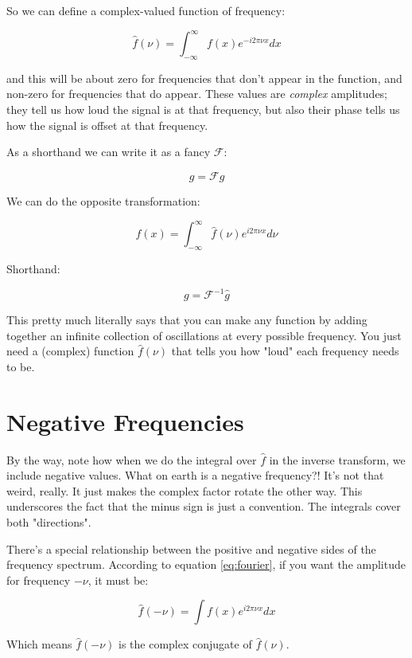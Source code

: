 So we can define a complex-valued function of frequency:

\begin{equation}
    \hat{f}(\nu) = \int_{-\infty}^{\infty} f(x)e^{-i2\pi\nu x} dx
    \label{eq:fourier}
\end{equation}

and this will be about zero for frequencies that don't appear in the function, and non-zero for frequencies that do appear. These values are \textit{complex} amplitudes; they tell us how loud the signal is at that frequency, but also their phase tells us how the signal is offset at that frequency.

As a shorthand we can write it as a fancy $\mathcal{F}$:

$$\hat{g} = \mathcal{F} g$$

We can do the opposite transformation:

\begin{equation}    
f(x) = \int_{-\infty}^{\infty} \hat{f}(\nu)e^{i2\pi\nu x} d\nu
\label{eq:invfourier}
\end{equation}

Shorthand:

$$g = \mathcal{F}^{-1} \hat{g}$$

This pretty much literally says that you can make any function by adding together an infinite collection of oscillations at every possible frequency. You just need a (complex) function $\hat{f}(\nu)$ that tells you how "loud" each frequency needs to be.

\section{Negative Frequencies}

By the way, note how when we do the integral over $\hat{f}$ in the inverse transform, we include negative values. What on earth is a negative frequency?! It's not that weird, really. It just makes the complex factor rotate the other way. This underscores the fact that the minus sign is just a convention. The integrals cover both "directions".

There's a special relationship between the positive and negative sides of the frequency spectrum. According to equation \eqref{eq:fourier}, if you want the amplitude for frequency $-\nu$, it must be:

$$
\hat{f}(-\nu) = \int f(x)e^{i2\pi\nu x} dx
\label{3}
$$

Which means $\hat{f}(-\nu)$ is the complex conjugate of $\hat{f}(\nu)$.

